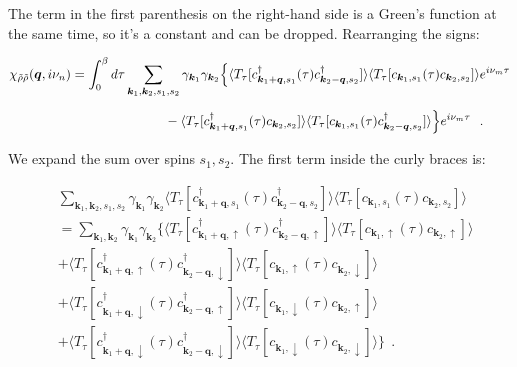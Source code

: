 \documentclass[a4j]{jsarticle}
\begin{document}
The term in the first parenthesis on the right-hand side is a Green's function at the same time, so it's a constant and can be dropped.
Rearranging the signs:

\begin{align}
	\chi_{\tilde{\rho} \tilde{\rho}}(\bm{q},i \nu_{n})
	&=
	\int^{\beta}_{0} d \tau
	\sum_{\bm{k}_{1} , \bm{k}_{2} , s_{1} ,s_{2} }
	\gamma_{\bm{k}_{1}}
	\gamma_{\bm{k}_{2}}
	\Big\{
	\langle T_{\tau} [
			c_{ \bm{k}_{1}+\bm{q} , s_{1} }^{\dagger} (\tau)
			c_{ \bm{k}_{2}-\bm{q} , s_{2} }^{\dagger}
		] \rangle
	\langle T_{\tau} [
			c_{ \bm{k}_{1} , s_{1} } (\tau)
			c_{ \bm{k}_{2} , s_{2} }
		] \rangle
	e^{i \nu_{m} \tau}
	\nonumber \\[2mm]
	& \hspace{25mm} -
	\langle T_{\tau} [
			c_{ \bm{k}_{1}+\bm{q} , s_{1} }^{\dagger} (\tau)
			c_{ \bm{k}_{2} , s_{2} }
		] \rangle
	\langle T_{\tau} [
			c_{ \bm{k}_{1} , s_{1} } (\tau)
			c_{ \bm{k}_{2}-\bm{q} , s_{2} }^{\dagger}
		] \rangle
	\Big\}
	e^{i \nu_{m} \tau}
	\ \ .
	\label{eqn:timeintegralbefore141125}
\end{align}

We expand the sum over spins $s_{1},s_{2}$.
The first term inside the curly braces is:

\begin{align}
	&
	\sum_{\bm{k}_{1} , \bm{k}_{2} , s_{1} ,s_{2} }
	\gamma_{\bm{k}_{1}}
	\gamma_{\bm{k}_{2}}
	\langle T_{\tau} [
			c_{ \bm{k}_{1}+\bm{q} , s_{1} }^{\dagger} (\tau)
			c_{ \bm{k}_{2}-\bm{q} , s_{2} }^{\dagger}
		] \rangle
	\langle T_{\tau} [
			c_{ \bm{k}_{1} , s_{1} } (\tau)
			c_{ \bm{k}_{2} , s_{2} }
		] \rangle
	\\ &=
	\sum_{\bm{k}_{1} , \bm{k}_{2} }
	\gamma_{\bm{k}_{1}}
	\gamma_{\bm{k}_{2}}
	\Big\{
	\langle T_{\tau} [
			c_{ \bm{k}_{1}+\bm{q} , \uparrow }^{\dagger} (\tau)
			c_{ \bm{k}_{2}-\bm{q} , \uparrow }^{\dagger}
		] \rangle
	\langle T_{\tau} [
			c_{ \bm{k}_{1} , \uparrow } (\tau)
			c_{ \bm{k}_{2} , \uparrow }
		] \rangle
	\nonumber \\ &+
	\langle T_{\tau} [
			c_{ \bm{k}_{1}+\bm{q} , \uparrow }^{\dagger} (\tau)
			c_{ \bm{k}_{2}-\bm{q} , \downarrow }^{\dagger}
		] \rangle
	\langle T_{\tau} [
			c_{ \bm{k}_{1} , \uparrow } (\tau)
			c_{ \bm{k}_{2} , \downarrow }
		] \rangle
	\nonumber \\[2mm] &+
	\langle T_{\tau} [
			c_{ \bm{k}_{1}+\bm{q} , \downarrow }^{\dagger} (\tau)
			c_{ \bm{k}_{2}-\bm{q} , \uparrow }^{\dagger}
		] \rangle
	\langle T_{\tau} [
			c_{ \bm{k}_{1} , \downarrow } (\tau)
			c_{ \bm{k}_{2} , \uparrow }
		] \rangle
	\nonumber \\[2mm] &+
	\langle T_{\tau} [
			c_{ \bm{k}_{1}+\bm{q} , \downarrow }^{\dagger} (\tau)
			c_{ \bm{k}_{2}-\bm{q} , \downarrow }^{\dagger}
		] \rangle
	\langle T_{\tau} [
			c_{ \bm{k}_{1} , \downarrow } (\tau)
			c_{ \bm{k}_{2} , \downarrow }
		] \rangle
	\Big\}
	\ \ .
\end{align}
\end{document}
